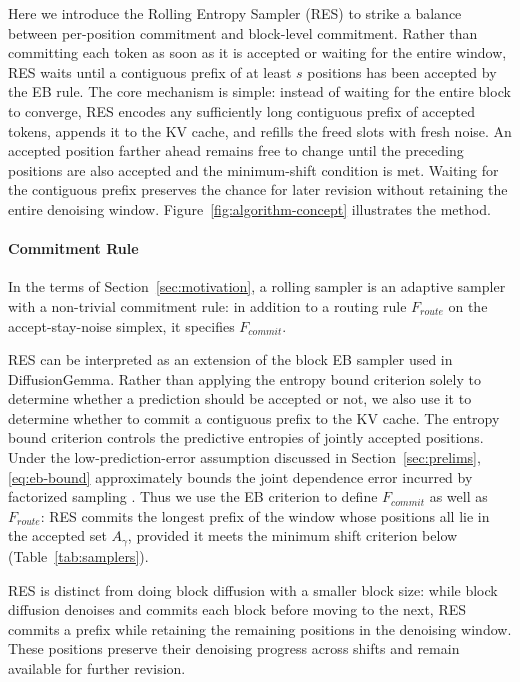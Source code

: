 Here we introduce the Rolling Entropy Sampler (RES) to strike a balance between per-position commitment and block-level commitment. Rather than committing each token as soon as it is accepted or waiting for the entire window, RES waits until a contiguous prefix of at least $s$ positions has been accepted by the EB rule.
The core mechanism is simple: instead of waiting for the entire block to converge, RES encodes any sufficiently long contiguous prefix of accepted tokens, appends it to the KV cache, and refills the freed slots with fresh noise.
An accepted position farther ahead remains free to change until the preceding positions are also accepted and the minimum-shift condition is met. Waiting for the contiguous prefix preserves the chance for later revision without retaining the entire denoising window.
Figure~\ref{fig:algorithm-concept} illustrates the method.


\paragraph{Commitment Rule}
In the terms of Section~\ref{sec:motivation}, a rolling sampler is an adaptive sampler with a non-trivial commitment rule: in addition to a routing rule $F_{route}$ on the accept-stay-noise simplex, it specifies $F_{commit}$.

RES can be interpreted as an extension of the block EB sampler used in DiffusionGemma.
Rather than applying the entropy bound criterion solely to determine whether a prediction should be accepted or not, we also use it to determine whether to commit a contiguous prefix to the KV cache.
The entropy bound criterion controls the predictive entropies of jointly accepted positions. Under the low-prediction-error assumption discussed in Section~\ref{sec:prelims}, \eqref{eq:eb-bound} approximately bounds the joint dependence error incurred by factorized sampling \citep{ben2026accelerated}.
Thus we use the EB criterion to define $F_{commit}$ as well as $F_{route}$: RES commits the longest prefix of the window whose positions all lie in the accepted set $A_{\gamma}$, provided it meets the minimum shift criterion below (Table~\ref{tab:samplers}).

RES is distinct from doing block diffusion with a smaller block size: while block diffusion denoises and commits each block before moving to the next, RES commits a prefix while retaining the remaining positions in the denoising window. These positions preserve their denoising progress across shifts and remain available for further revision.


